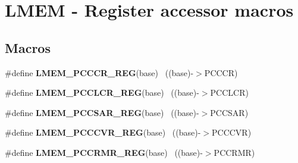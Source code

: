 \hypertarget{group___l_m_e_m___register___accessor___macros}{}\section{L\+M\+E\+M -\/ Register accessor macros}
\label{group___l_m_e_m___register___accessor___macros}
\subsection*{Macros}
\begin{DoxyCompactItemize}
\item 
\hypertarget{group___l_m_e_m___register___accessor___macros_ga3563e2964bbf1bf4402574b26ac5ca48}{}\#define {\bfseries L\+M\+E\+M\+\_\+\+P\+C\+C\+C\+R\+\_\+\+R\+E\+G}(base)                                      ~((base)-\/$>$P\+C\+C\+C\+R)\label{group___l_m_e_m___register___accessor___macros_ga3563e2964bbf1bf4402574b26ac5ca48}

\item 
\hypertarget{group___l_m_e_m___register___accessor___macros_ga39dba6997b0cff222fd3d59a702aa383}{}\#define {\bfseries L\+M\+E\+M\+\_\+\+P\+C\+C\+L\+C\+R\+\_\+\+R\+E\+G}(base)                                    ~((base)-\/$>$P\+C\+C\+L\+C\+R)\label{group___l_m_e_m___register___accessor___macros_ga39dba6997b0cff222fd3d59a702aa383}

\item 
\hypertarget{group___l_m_e_m___register___accessor___macros_gac3018c7c11e5d72331fd505a4705c107}{}\#define {\bfseries L\+M\+E\+M\+\_\+\+P\+C\+C\+S\+A\+R\+\_\+\+R\+E\+G}(base)                                    ~((base)-\/$>$P\+C\+C\+S\+A\+R)\label{group___l_m_e_m___register___accessor___macros_gac3018c7c11e5d72331fd505a4705c107}

\item 
\hypertarget{group___l_m_e_m___register___accessor___macros_ga7c0ea117668c7f369e9138c69df5ca6f}{}\#define {\bfseries L\+M\+E\+M\+\_\+\+P\+C\+C\+C\+V\+R\+\_\+\+R\+E\+G}(base)                                    ~((base)-\/$>$P\+C\+C\+C\+V\+R)\label{group___l_m_e_m___register___accessor___macros_ga7c0ea117668c7f369e9138c69df5ca6f}

\item 
\hypertarget{group___l_m_e_m___register___accessor___macros_ga13ff357f51abd5e95210ea97288e34e1}{}\#define {\bfseries L\+M\+E\+M\+\_\+\+P\+C\+C\+R\+M\+R\+\_\+\+R\+E\+G}(base)                                    ~((base)-\/$>$P\+C\+C\+R\+M\+R)\label{group___l_m_e_m___register___accessor___macros_ga13ff357f51abd5e95210ea97288e34e1}


\end{DoxyCompactItemize}
